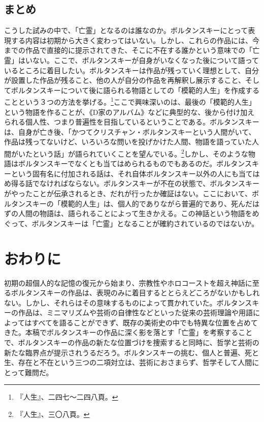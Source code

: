 \documentclass[b5j,twoside,twocolumn]{utarticle}
\begin{document}
\subsection{まとめ}
こうした試みの中で、「亡霊」となるのは誰なのか。ボルタンスキーにとって表現する内容は初期から大きく変わってはいない。しかし、これらの作品には、今までの作品で直接的に提示されてきた、そこに不在する誰かという意味での「亡霊」はいない。ここで、ボルタンスキーが自身がいなくなった後について語っているところに着目したい。ボルタンスキーは作品が残っていく理想として、自分が設置した作品が残ること、他の人が自分の作品を再解釈し展示すること、そしてボルタンスキーについて後に語られる物語としての「模範的人生」を作成することという３つの方法を挙げる。\footnote{『人生』、二四七～二四八頁。}ここで興味深いのは、最後の「模範的人生」という物語を作ることが、《D家のアルバム》などに典型的な、後から付け加えられる個人性、つまり普遍性を目指しているということである。ボルタンスキーは、自身が亡き後、「かつてクリスチャン・ボルタンスキーという人間がいて、作品は残ってないけど、いろいろな問いを投げかけた人間、物語を語っていた人間がいたという話」が語られていくことを望んでいる。\footnote{『人生』、三〇八頁。}しかし、そのような物語はボルタンスキーでなくとも当てはめられるものでもあるのだ。ボルタンスキーという固有名に付加される話は、それ自体ボルタンスキー以外の人にも当てはめ得る話でなければならない。ボルタンスキーが不在の状態で、ボルタンスキーがやったことが伝承されるとき、だれが行ったか確証はない。ここにおいて、ボルタンスキーの「模範的人生」は、個人的でありながら普遍的であり、死んだはずの人間の物語は、語られることによって生きかえる。この神話という物語をめぐって、ボルタンスキーは「亡霊」となることが確約されているのではないか。


\section{おわりに}
初期の超個人的な記憶の復元から始まり、宗教性やホロコーストを超え神話に至るボルタンスキーの作品は、表現のみに着目するととらえどころがないかもしれない。しかし、それらはその意味するものによって貫かれていた。ボルタンスキーの作品は、ミニマリズムや芸術の自律性などといった従来の芸術理論や用語によってはすべてを語ることができず、既存の美術史の中でも特異な位置を占めてきた。本稿でボルタンスキーの作品に深く影を落とす「亡霊」を考察することで、ボルタンスキーの作品の新たな位置づけを捜索すると同時に、哲学と芸術の新たな臨界点が提示されうるだろう。ボルタンスキーの挑む、個人と普遍、死と生、存在と不在という三つの二項対立は、芸術におさまらず、哲学そして人間にとって難問だ。
\end{document}
